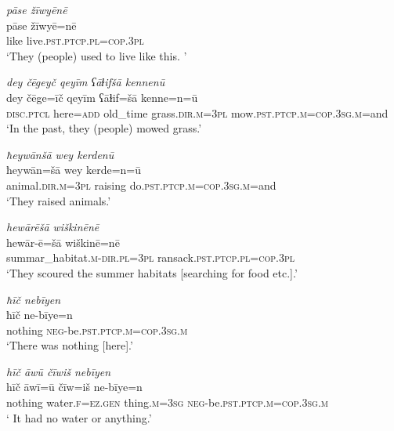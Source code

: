\ea \label{RE.72}
\textit{pāse žīwyēnē} \\ 
\gll pāse žīwyē=nē \\ 
 like live\textsc{.pst}\textsc{.ptcp}\textsc{.pl}\textsc{=cop}\textsc{.3pl} \\ 
\glt `They (people) used to live like this. '
\z 
 
 


\ea \label{ŽE.1}
\textit{dey čēgeyč qeyīm ʕāɫifšā kennenū} \\ 
\gll dey čēge=īč qeyīm ʕāɫif=šā kenne=n=ū \\ 
 \textsc{disc.ptcl} here\textsc{=add} old\_time grass\textsc{.dir}\textsc{.m}\textsc{=3pl} mow\textsc{.pst}\textsc{.ptcp}\textsc{.m}\textsc{=cop}\textsc{.3sg}\textsc{.m}=and \\ 
\glt `In the past, they (people) mowed grass.'
\z 
 
\ea \label{ŽE.2}
\textit{ħeywānšā wey kerdenū} \\ 
\gll ħeywān=šā wey kerde=n=ū \\ 
 animal\textsc{.dir}\textsc{.m}\textsc{=3pl} raising do\textsc{.pst}\textsc{.ptcp}\textsc{.m}\textsc{=cop}\textsc{.3sg}\textsc{.m}=and \\ 
\glt `They raised animals.'
\z 
 
\ea \label{ŽE.3}
\textit{hewārēšā wiškinēnē} \\ 
\gll hewār-ē=šā wiškinē=nē \\ 
 summar\_habitat\textsc{.m}\textsc{-dir}\textsc{.pl}\textsc{=3pl} ransack\textsc{.pst}\textsc{.ptcp}\textsc{.pl}\textsc{=cop}\textsc{.3pl} \\ 
\glt `They scoured the summer habitats [searching for food etc.].'
\z 
 
\ea \label{ŽE.5}
\textit{ħīč nebīyen} \\ 
\gll ħīč ne-bīye=n \\ 
 nothing \textsc{neg-}be\textsc{.pst}\textsc{.ptcp}\textsc{.m}\textsc{=cop}\textsc{.3sg}\textsc{.m} \\ 
\glt `There was nothing [here].'
\z 
 
\ea \label{ŽE.7}
\textit{hīč āwū čīwiš nebīyen} \\ 
\gll hīč āwī=ū čīw=iš ne-bīye=n \\ 
 nothing water\textsc{.f}\textsc{\textsc{=ez.gen}} thing\textsc{.m}\textsc{=3sg} \textsc{neg-}be\textsc{.pst}\textsc{.ptcp}\textsc{.m}\textsc{=cop}\textsc{.3sg}\textsc{.m} \\ 
\glt ` It had no water or anything.'
\z 
 
